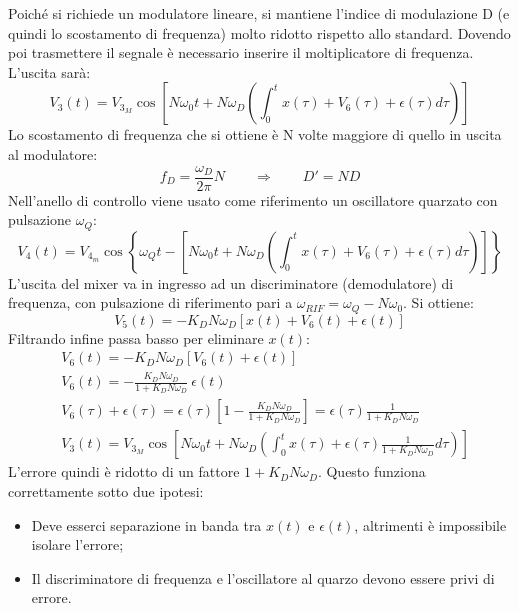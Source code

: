 Poiché si richiede un modulatore lineare, si mantiene l'indice di modulazione D (e quindi lo scostamento di frequenza) molto ridotto rispetto allo standard. Dovendo poi trasmettere il segnale è necessario inserire il moltiplicatore di frequenza. L'uscita sarà:
$$V_3(t) = V_{3_M} \cos\left[ N\omega_0t + N\omega_D\left( \int_{0}^{t} x(\tau) + V_6(\tau) + \epsilon(\tau) d\tau\right)\right]$$
Lo scostamento di frequenza che si ottiene è N volte maggiore di quello in uscita al modulatore:
\[
f_D = \frac{\omega_D}{2\pi}N
\qquad\Rightarrow\qquad
D' = N D
\]
Nell'anello di controllo viene usato come riferimento un oscillatore quarzato con pulsazione $\omega_Q$:
$$V_4(t) = V_{4_m} \cos\left\lbrace 
\omega_Qt-\left[
N\omega_0t + N\omega_D\left( \int_{0}^{t} x(\tau) + V_6(\tau) + \epsilon(\tau) d\tau\right)\right]
\right\rbrace
$$
L'uscita del mixer va in ingresso ad un discriminatore (demodulatore) di frequenza, con pulsazione di riferimento pari a $\omega_{RIF}=\omega_Q-N\omega_0$. Si ottiene:
%
$$V_5(t) = - K_D N \omega_D\left[ x(t) + V_6(t) + \epsilon(t) \right]$$
Filtrando infine passa basso per eliminare $x(t)$:
\begin{align*}
&V_6(t) = - K_D N \omega_D\left[V_6(t) + \epsilon(t) \right]
\\
&V_6(t) = - \frac{K_D N \omega_D}{1+K_DN\omega_D} ~ \epsilon(t)
\\
&V_6(\tau) + \epsilon(\tau) = \epsilon(\tau) \left[ 1 - \frac{K_D N \omega_D}{1+K_DN\omega_D} \right] = \epsilon(\tau) \frac{1}{1+K_DN\omega_D}\\
&V_3(t) = V_{3_M} \cos\left[ N\omega_0t + N\omega_D\left( \int_{0}^{t} x(\tau) + \epsilon(\tau) \frac{1}{1+K_DN\omega_D} d\tau\right)\right]
\end{align*}
L'errore quindi è ridotto di un fattore $1+K_DN\omega_D$. Questo funziona correttamente sotto due ipotesi:
\begin{itemize}
\item Deve esserci separazione in banda tra $x(t)$ e $\epsilon(t)$, altrimenti è impossibile isolare l'errore;
\item Il discriminatore di frequenza e l'oscillatore al quarzo devono essere privi di errore.
\end{itemize}

